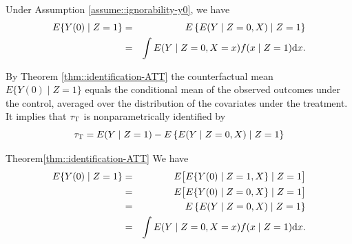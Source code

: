 \begin{theorem}
\label{thm::identification-ATT}
Under Assumption \ref{assume::ignorability-y0}, we have 
\begin{eqnarray*}
 E\{    Y(0) \mid Z=1 \}  &=& E\left\{  E(    Y \mid Z=0 , X) \mid  Z=1  \right\} \\
 &=&  \int  E(    Y \mid Z=0 , X=x) f(  x \mid Z=1) \textup{d} x .
\end{eqnarray*}
\end{theorem}


By Theorem \ref{thm::identification-ATT} the counterfactual mean $ E\{    Y(0) \mid Z=1 \}  $ equals the conditional mean of the observed outcomes under the control, averaged over the distribution of the covariates under the treatment.
It implies that $\tau_\textsc{T} $ is nonparametrically  identified by
\begin{equation}
\tau_\textsc{T}  = E(Y\mid Z=1) -E\left\{  E(    Y \mid Z=0 , X) \mid  Z=1  \right\}  \label{eq::att-identification} 
\end{equation}

\begin{myproof}{Theorem}{\ref{thm::identification-ATT}} 
We have 
\begin{eqnarray*}
 E\{    Y(0) \mid Z=1 \} &=&  E\big[   E\{    Y(0) \mid Z=1 , X\} \mid  Z=1  \big] \\
 &=& E\big[   E\{    Y(0) \mid Z=0 , X\} \mid  Z=1  \big] \\
 &=& E\left\{  E(    Y \mid Z=0 , X) \mid  Z=1  \right\} \\
 &=& \int  E(    Y \mid Z=0 , X=x) f(  x \mid Z=1)  \textup{d} x.
\end{eqnarray*}
\end{myproof}


